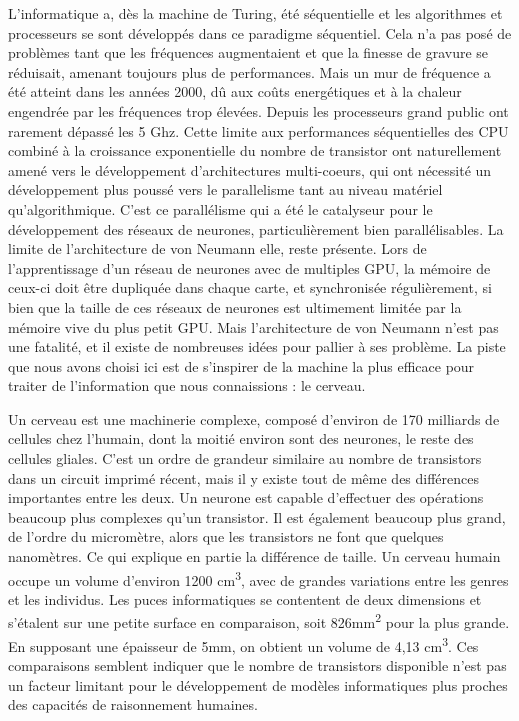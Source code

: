	L'informatique a, dès la machine de Turing, été séquentielle et les algorithmes et processeurs se sont développés dans ce paradigme séquentiel. Cela n'a pas posé de problèmes tant que les fréquences augmentaient et que la finesse de gravure se réduisait, amenant toujours plus de performances. Mais un mur de fréquence a été atteint dans les années 2000, dû aux coûts energétiques et à la chaleur engendrée par les fréquences trop élevées. Depuis les processeurs grand public ont rarement dépassé les 5 Ghz. Cette limite aux performances séquentielles des CPU combiné à la croissance exponentielle du nombre de transistor ont naturellement amené vers le développement d'architectures multi-coeurs, qui ont nécessité un développement plus poussé vers le parallelisme tant au niveau matériel qu'algorithmique. C'est ce parallélisme qui a été le catalyseur pour le développement des réseaux de neurones, particulièrement bien parallélisables. La limite de l'architecture de von Neumann elle, reste présente. Lors de l'apprentissage d'un réseau de neurones avec de multiples GPU, la mémoire de ceux-ci doit être dupliquée dans chaque carte, et synchronisée régulièrement, si bien que la taille de ces réseaux de neurones est ultimement limitée par la mémoire vive du plus petit GPU. Mais l'architecture de von Neumann n'est pas une fatalité, et il existe de nombreuses idées pour pallier à ses problème. La piste que nous avons choisi ici est de s'inspirer de la machine la plus efficace pour traiter de l'information que nous connaissions : le cerveau.

	Un cerveau est une machinerie complexe, composé d'environ de 170 milliards de cellules chez l'humain, dont la moitié environ sont des neurones, le reste des cellules gliales. C'est un ordre de grandeur similaire au nombre de transistors dans un circuit imprimé récent, mais il y existe tout de même des différences importantes entre les deux. Un neurone est capable d'effectuer des opérations beaucoup plus complexes qu'un transistor. Il est également beaucoup plus grand, de l'ordre du micromètre, alors que les transistors ne font que quelques nanomètres. Ce qui explique en partie la différence de taille. Un cerveau humain occupe un volume d'environ 1200 cm\textsuperscript{3}, avec de grandes variations entre les genres et les individus. Les puces informatiques se contentent de deux dimensions et s'étalent sur une petite surface en comparaison, soit 826mm\textsuperscript{2} pour la plus grande. En supposant une épaisseur de 5mm, on obtient un volume de 4,13 cm\textsuperscript{3}. Ces comparaisons semblent indiquer que le nombre de transistors disponible n'est pas un facteur limitant pour le développement de modèles informatiques plus proches des capacités de raisonnement humaines.

